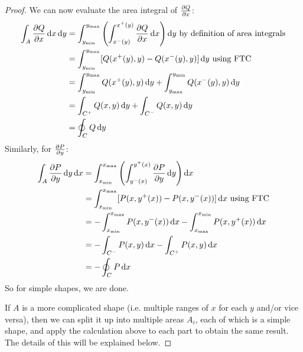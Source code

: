 \documentclass[../main.tex]{subfiles}
\begin{document}
\begin{proof}
  We can now evaluate the area integral of $\pderiv{Q}{x}$:
  \begin{align*}
    \int_{A} \pderiv{Q}{x} \d{x} \d{y} &= \int_{y_{\text{min}}}^{y_{\text{max}}} \left(\int_{x^{-}(y)}^{x^{+}(y)} \pderiv{Q}{x} \d{x}\right) \d{y} \text{ by definition of area integrals} \\
                                       &= \int_{y_{\text{min}}}^{y_{\text{max}}} [Q(x^{+}(y), y) - Q(x^{-}(y), y)] \d{y} \text{ using FTC} \\
                                       &= \int_{y_{\text{min}}}^{y_{\text{max}}} Q(x^{+}(y), y) \d{y} + \int_{y_{\text{max}}}^{y_{\text{min}}} Q(x^{-}(y), y) \d{y} \\
                                       &= \int_{C^{+}} Q(x, y) \d{y} + \int_{C^{-}} Q(x, y) \d{y} \\
                                       &= \oint_C Q \d{y}
  \end{align*}
  Similarly, for $\pderiv{P}{y}$:
  \begin{align*}
    \int_{A} \pderiv{P}{y} \d{y} \d{x} &= \int_{x_{\text{min}}}^{x_{\text{max}}} \left(\int_{y^{-}(x)}^{y^{+}(x)} \pderiv{P}{y} \d{y}\right) \d{x} \\
                                       &= \int_{x_{\text{min}}}^{x_{\text{max}}} [P(x, y^{+}(x)) - P(x, y^{-}(x))] \d{x} \text{ using FTC} \\
                                       &= -\int_{x_{\text{min}}}^{x_{\text{max}}} P(x, y^{-}(x)) \d{x} - \int_{x_{\text{max}}}^{x_{\text{min}}} P(x, y^{+}(x)) \d{x} \\
                                       &= -\int_{C^{-}} P(x, y) \d{x} - \int_{C^{+}} P(x, y) \d{x} \\
                                       &= -\oint_C P \d{x}
  \end{align*}
  So for simple shapes, we are done.

  If $A$ is a more complicated shape (i.e. multiple ranges of $x$ for each $y$ and/or vice versa), then we can split it up into multiple areas $A_i$, each of which is a simple shape, and apply the calculation above to each part to obtain the same result.
  The details of this will be explained below.
\end{proof}
\end{document}
